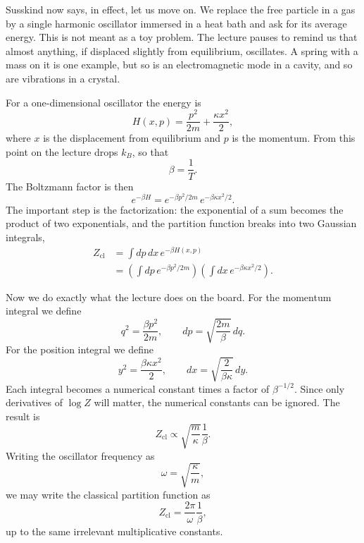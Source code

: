 Susskind now says, in effect, let us move on. We replace the free particle in a gas by a single harmonic oscillator immersed in a heat bath and ask for its average energy. This is not meant as a toy problem. The lecture pauses to remind us that almost anything, if displaced slightly from equilibrium, oscillates. A spring with a mass on it is one example, but so is an electromagnetic mode in a cavity, and so are vibrations in a crystal.

For a one-dimensional oscillator the energy is
\begin{equation}
H(x,p)=\frac{p^2}{2m}+\frac{\kappa x^2}{2},
\end{equation}
where \(x\) is the displacement from equilibrium and \(p\) is the momentum. From this point on the lecture drops \(k_B\), so that
\begin{equation}
\beta=\frac{1}{T}.
\end{equation}
The Boltzmann factor is then
\begin{equation}
e^{-\beta H}=e^{-\beta p^2/2m}\,e^{-\beta\kappa x^2/2}.
\end{equation}
The important step is the factorization: the exponential of a sum becomes the product of two exponentials, and the partition function breaks into two Gaussian integrals,
\begin{align}
Z_{\mathrm{cl}}
&=\int dp\,dx\,e^{-\beta H(x,p)} \\
&=\left(\int dp\,e^{-\beta p^2/2m}\right)
  \left(\int dx\,e^{-\beta\kappa x^2/2}\right).
\end{align}

Now we do exactly what the lecture does on the board. For the momentum integral we define
\begin{equation}
q^2=\frac{\beta p^2}{2m},
\qquad
dp=\sqrt{\frac{2m}{\beta}}\,dq.
\end{equation}
For the position integral we define
\begin{equation}
y^2=\frac{\beta\kappa x^2}{2},
\qquad
dx=\sqrt{\frac{2}{\beta\kappa}}\,dy.
\end{equation}
Each integral becomes a numerical constant times a factor of \(\beta^{-1/2}\). Since only derivatives of \(\log Z\) will matter, the numerical constants can be ignored. The result is
\begin{equation}
Z_{\mathrm{cl}}\propto \sqrt{\frac{m}{\kappa}}\frac{1}{\beta}.
\end{equation}
Writing the oscillator frequency as
\begin{equation}
\omega=\sqrt{\frac{\kappa}{m}},
\end{equation}
we may write the classical partition function as
\begin{equation}
Z_{\mathrm{cl}}=\frac{2\pi}{\omega}\frac{1}{\beta},
\end{equation}
up to the same irrelevant multiplicative constants.

